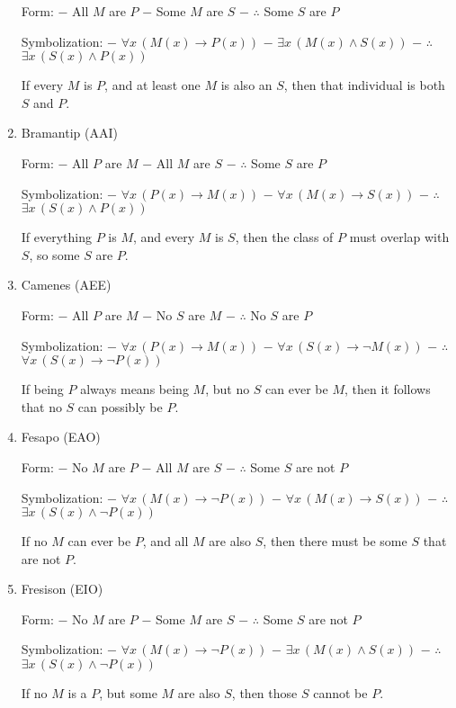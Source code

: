 \begin{enumerate}
  Form: − All \(M\) are \(P\) − Some \(M\) are \(S\) − \(\therefore\)
  Some \(S\) are \(P\)

  Symbolization: − \(\forall x \, (M(x) \rightarrow P(x))\) −
  \(\exists x \, (M(x) \land S(x))\) − \(\therefore\)
  \(\exists x \, (S(x) \land P(x))\)

  If every \(M\) is \(P\), and at least one \(M\) is also an \(S\), then
  that individual is both \(S\) and \(P\).
\item
  Bramantip (AAI)

  Form: − All \(P\) are \(M\) − All \(M\) are \(S\) − \(\therefore\)
  Some \(S\) are \(P\)

  Symbolization: − \(\forall x \, (P(x) \rightarrow M(x))\) −
  \(\forall x \, (M(x) \rightarrow S(x))\) − \(\therefore\)
  \(\exists x \, (S(x) \land P(x))\)

  If everything \(P\) is \(M\), and every \(M\) is \(S\), then the class
  of \(P\) must overlap with \(S\), so some \(S\) are \(P\).
\item
  Camenes (AEE)

  Form: − All \(P\) are \(M\) − No \(S\) are \(M\) − \(\therefore\) No
  \(S\) are \(P\)

  Symbolization: − \(\forall x \, (P(x) \rightarrow M(x))\) −
  \(\forall x \, (S(x) \rightarrow \lnot M(x))\) − \(\therefore\)
  \(\forall x \, (S(x) \rightarrow \lnot P(x))\)

  If being \(P\) always means being \(M\), but no \(S\) can ever be
  \(M\), then it follows that no \(S\) can possibly be \(P\).
\item
  Fesapo (EAO)

  Form: − No \(M\) are \(P\) − All \(M\) are \(S\) − \(\therefore\) Some
  \(S\) are not \(P\)

  Symbolization: − \(\forall x \, (M(x) \rightarrow \lnot P(x))\) −
  \(\forall x \, (M(x) \rightarrow S(x))\) − \(\therefore\)
  \(\exists x \, (S(x) \land \lnot P(x))\)

  If no \(M\) can ever be \(P\), and all \(M\) are also \(S\), then
  there must be some \(S\) that are not \(P\).
\item
  Fresison (EIO)

  Form: − No \(M\) are \(P\) − Some \(M\) are \(S\) − \(\therefore\)
  Some \(S\) are not \(P\)

  Symbolization: − \(\forall x \, (M(x) \rightarrow \lnot P(x))\) −
  \(\exists x \, (M(x) \land S(x))\) − \(\therefore\)
  \(\exists x \, (S(x) \land \lnot P(x))\)

  If no \(M\) is a \(P\), but some \(M\) are also \(S\), then those
  \(S\) cannot be \(P\).
\end{enumerate}
